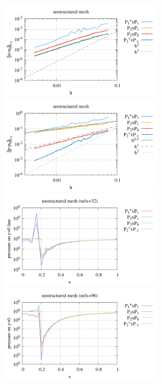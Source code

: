 \begin{center}
\includegraphics[width=8cm]{python_codes/fieldstone_120/paperresults/solvi_unstructured_errorsV.pdf}
\includegraphics[width=8cm]{python_codes/fieldstone_120/paperresults/solvi_unstructured_errorsP.pdf}\\
\includegraphics[width=8cm]{python_codes/fieldstone_120/paperresults/solvi_p_profile_unstructured_32.pdf}
\includegraphics[width=8cm]{python_codes/fieldstone_120/paperresults/solvi_p_profile_unstructured_96.pdf}
\end{center}

